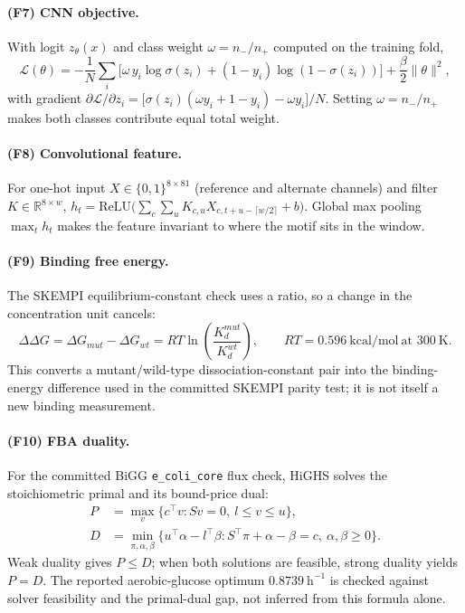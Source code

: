 \documentclass[11pt]{article}
\begin{document}
\paragraph{(F7) CNN objective.} With logit $z_\theta(x)$ and class weight
$\omega = n_-/n_+$ computed on the training fold,
\begin{equation}
\mathcal{L}(\theta) = -\frac1N\sum_{i}\Big[\omega\, y_i\log\sigma(z_i) + (1-y_i)\log(1-\sigma(z_i))\Big] + \frac{\beta}{2}\|\theta\|^2,
\end{equation}
with gradient $\partial\mathcal{L}/\partial z_i = \big[\sigma(z_i)(\omega y_i + 1 - y_i) - \omega y_i\big]/N$.
Setting $\omega = n_-/n_+$ makes both classes contribute equal total weight.

\paragraph{(F8) Convolutional feature.} For one-hot input
$X\in\{0,1\}^{8\times81}$ (reference and alternate channels) and filter
$K\in\mathbb{R}^{8\times w}$,
$h_t = \mathrm{ReLU}\big(\sum_{c}\sum_{u} K_{c,u} X_{c,t+u-\lceil w/2\rceil} + b\big)$.
Global max pooling $\max_t h_t$ makes the feature invariant to where the motif
sits in the window.

\paragraph{(F9) Binding free energy.} The SKEMPI equilibrium-constant check uses a ratio, so a change in the concentration unit cancels:
\begin{equation}\label{eq:binding-ddg}
\Delta\Delta G = \Delta G_{mut}-\Delta G_{wt}
 = RT\ln\!\left(\frac{K_d^{mut}}{K_d^{wt}}\right),
 \qquad RT=0.596\ \mathrm{kcal/mol}\ \text{at }300\ \mathrm K.
\end{equation}
This converts a mutant/wild-type dissociation-constant pair into the binding-energy difference used in the committed SKEMPI parity test; it is not itself a new binding measurement.

\paragraph{(F10) FBA duality.} For the committed BiGG \texttt{e\_coli\_core} flux check, HiGHS solves the stoichiometric primal and its bound-price dual:
\begin{equation}\label{eq:fba-primal-dual}
\begin{aligned}
P&=\max_v\{c^\top v:Sv=0,\ l\le v\le u\},\\
D&=\min_{\pi,\alpha,\beta}\{u^\top\alpha-l^\top\beta:
S^\top\pi+\alpha-\beta=c,\ \alpha,\beta\ge0\}.
\end{aligned}
\end{equation}
Weak duality gives $P\le D$; when both solutions are feasible, strong duality yields $P=D$. The reported aerobic-glucose optimum $0.8739\ \mathrm{h}^{-1}$ is checked against solver feasibility and the primal-dual gap, not inferred from this formula alone.
\end{document}
